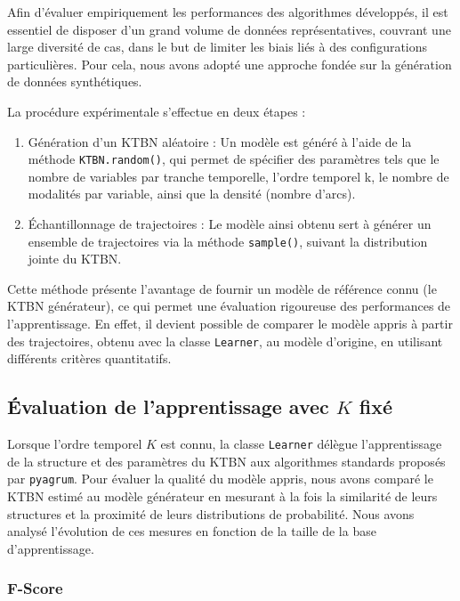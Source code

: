 \documentclass{article}
\begin{document}
Afin d'évaluer empiriquement les performances des algorithmes développés, il est essentiel de disposer d'un grand
volume de données représentatives, couvrant une large diversité de cas, dans le but de limiter les biais liés à
des configurations particulières. Pour cela, nous avons adopté une approche fondée sur la génération de données synthétiques.

La procédure expérimentale s'effectue en deux étapes :

\begin{enumerate}
    \item Génération d'un KTBN aléatoire : Un modèle est généré à l'aide de la méthode \texttt{KTBN.random()}, qui
          permet de spécifier des paramètres tels que le nombre de variables par tranche temporelle, l'ordre temporel k,
          le nombre de modalités par variable, ainsi que la densité (nombre d'arcs).
    \item Échantillonnage de trajectoires : Le modèle ainsi obtenu sert à générer un ensemble de trajectoires via
          la méthode \texttt{sample()}, suivant la distribution jointe du KTBN.
\end{enumerate}

Cette méthode présente l'avantage de fournir un modèle de référence connu (le KTBN générateur), ce qui permet une
évaluation rigoureuse des performances de l'apprentissage. En effet, il devient possible de comparer le modèle appris
à partir des trajectoires, obtenu avec la classe \texttt{Learner}, au modèle d'origine, en utilisant différents
critères quantitatifs.


\subsection{Évaluation de l'apprentissage avec $K$ fixé}

Lorsque l'ordre temporel $K$ est connu, la classe \texttt{Learner} délègue l'apprentissage de la structure et des
paramètres du KTBN aux algorithmes standards proposés par \texttt{pyagrum}. Pour évaluer la qualité du modèle appris,
nous avons comparé le KTBN estimé au modèle générateur en mesurant à la fois la similarité de leurs structures et
la proximité de leurs distributions de probabilité. Nous avons analysé l'évolution de ces mesures en fonction de la
taille de la base d'apprentissage.

\subsubsection{F-Score}
\end{document}
